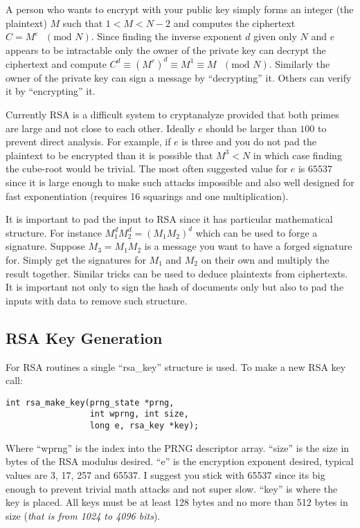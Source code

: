 \documentclass[a4paper]{book}
\begin{document}
A person who wants to encrypt with your public key simply forms an integer (the plaintext) $M$ such that 
$1 < M < N-2$ and computes the ciphertext $C = M^e\mbox{ }(\mbox{mod }N)$.  Since finding the inverse exponent $d$
given only $N$ and $e$ appears to be intractable only the owner of the private key can decrypt the ciphertext and compute
$C^d \equiv \left (M^e \right)^d \equiv M^1 \equiv M\mbox{ }(\mbox{mod }N)$.  Similarly the owner of the private key 
can sign a message by ``decrypting'' it.  Others can verify it by ``encrypting'' it.  

Currently RSA is a difficult system to cryptanalyze provided that both primes are large and not close to each other.  
Ideally $e$ should be larger than $100$ to prevent direct analysis.  For example, if $e$ is three and you do not pad
the plaintext to be encrypted than it is possible that $M^3 < N$ in which case finding the cube-root would be trivial.  
The most often suggested value for $e$ is $65537$ since it is large enough to make such attacks impossible and also well 
designed for fast exponentiation (requires 16 squarings and one multiplication).

It is important to pad the input to RSA since it has particular mathematical structure.  For instance  
$M_1^dM_2^d = (M_1M_2)^d$ which can be used to forge a signature.  Suppose $M_3 = M_1M_2$ is a message you want
to have a forged signature for.  Simply get the signatures for $M_1$ and $M_2$ on their own and multiply the result
together.  Similar tricks can be used to deduce plaintexts from ciphertexts.  It is important not only to sign 
the hash of documents only but also to pad the inputs with data to remove such structure.  

\subsection{RSA Key Generation}

For RSA routines a single ``rsa\_key'' structure is used.  To make a new RSA key call:
\begin{verbatim}
int rsa_make_key(prng_state *prng, 
                 int wprng, int size, 
                 long e, rsa_key *key);
\end{verbatim}

Where ``wprng'' is the index into the PRNG descriptor array.  ``size'' is the size in bytes of the RSA modulus desired.
``e'' is the encryption exponent desired, typical values are 3, 17, 257 and 65537.  I suggest you stick with 65537 since its big
enough to prevent trivial math attacks and not super slow.  ``key'' is where the key is placed.  All keys must be at 
least 128 bytes and no more than 512 bytes in size (\textit{that is from 1024 to 4096 bits}).
\end{document}
